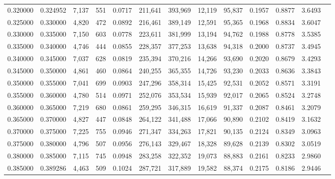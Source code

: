 \begin{tabular}{rrrrrrrrrrrrr}
0.320000 & 0.324952 &  7,137 &   551 &                                     0.0717 & 211,641 & 393,969 &  12,119 &  95,837 & 0.1957 & 0.8877 & 3.6493 \\
0.325000 & 0.330000 &  4,820 &   472 &                                     0.0892 & 216,461 & 389,149 &  12,591 &  95,365 & 0.1968 & 0.8834 & 3.6047 \\
0.330000 & 0.335000 &  7,150 &   603 &                                     0.0778 & 223,611 & 381,999 &  13,194 &  94,762 & 0.1988 & 0.8778 & 3.5385 \\
0.335000 & 0.340000 &  4,746 &   444 &                                     0.0855 & 228,357 & 377,253 &  13,638 &  94,318 & 0.2000 & 0.8737 & 3.4945 \\
0.340000 & 0.345000 &  7,037 &   628 &                                     0.0819 & 235,394 & 370,216 &  14,266 &  93,690 & 0.2020 & 0.8679 & 3.4293 \\
0.345000 & 0.350000 &  4,861 &   460 &                                     0.0864 & 240,255 & 365,355 &  14,726 &  93,230 & 0.2033 & 0.8636 & 3.3843 \\
0.350000 & 0.355000 &  7,041 &   699 &                                     0.0903 & 247,296 & 358,314 &  15,425 &  92,531 & 0.2052 & 0.8571 & 3.3191 \\
0.355000 & 0.360000 &  4,780 &   514 &                                     0.0971 & 252,076 & 353,534 &  15,939 &  92,017 & 0.2065 & 0.8524 & 3.2748 \\
0.360000 & 0.365000 &  7,219 &   680 &                                     0.0861 & 259,295 & 346,315 &  16,619 &  91,337 & 0.2087 & 0.8461 & 3.2079 \\
0.365000 & 0.370000 &  4,827 &   447 &                                     0.0848 & 264,122 & 341,488 &  17,066 &  90,890 & 0.2102 & 0.8419 & 3.1632 \\
0.370000 & 0.375000 &  7,225 &   755 &                                     0.0946 & 271,347 & 334,263 &  17,821 &  90,135 & 0.2124 & 0.8349 & 3.0963 \\
0.375000 & 0.380000 &  4,796 &   507 &                                     0.0956 & 276,143 & 329,467 &  18,328 &  89,628 & 0.2139 & 0.8302 & 3.0519 \\
0.380000 & 0.385000 &  7,115 &   745 &                                     0.0948 & 283,258 & 322,352 &  19,073 &  88,883 & 0.2161 & 0.8233 & 2.9860 \\
0.385000 & 0.389286 &  4,463 &   509 &                                     0.1024 & 287,721 & 317,889 &  19,582 &  88,374 & 0.2175 & 0.8186 & 2.9446 \\

\end{tabular}
